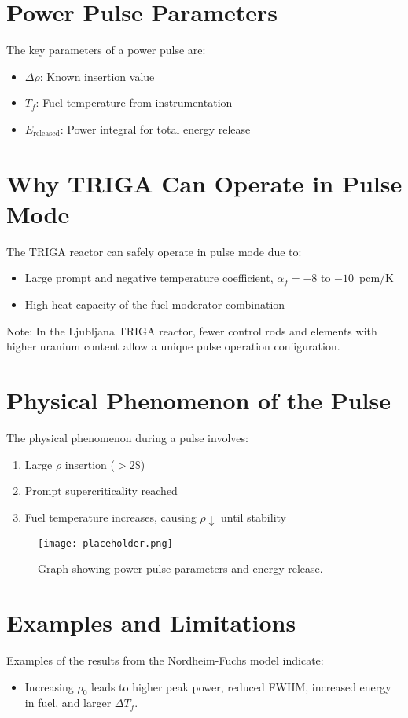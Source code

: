 \section{Power Pulse Parameters}
The key parameters of a power pulse are:
\begin{itemize}
    \item $\Delta \rho$: Known insertion value
    \item $T_f$: Fuel temperature from instrumentation
    \item $E_{\text{released}}$: Power integral for total energy release
\end{itemize}

\section{Why TRIGA Can Operate in Pulse Mode}
The TRIGA reactor can safely operate in pulse mode due to:
\begin{itemize}
    \item Large prompt and negative temperature coefficient, $\alpha_f = -8$ to $-10$~pcm/K
    \item High heat capacity of the fuel-moderator combination
\end{itemize}
Note: In the Ljubljana TRIGA reactor, fewer control rods and elements with higher uranium content allow a unique pulse operation configuration.

\section{Physical Phenomenon of the Pulse}
The physical phenomenon during a pulse involves:
\begin{enumerate}
    \item Large $\rho$ insertion ($> 2\$$)
    \item Prompt supercriticality reached
    \item Fuel temperature increases, causing $\rho \downarrow$ until stability
\end{enumerate}

\begin{figure}[h]
    \centering
    \texttt{[image: placeholder.png]}
    \caption{Graph showing power pulse parameters and energy release.}
    \label{fig:power_pulse}
\end{figure}

\section{Examples and Limitations}
Examples of the results from the Nordheim-Fuchs model indicate:
\begin{itemize}
    \item Increasing $\rho_0$ leads to higher peak power, reduced FWHM, increased energy in fuel, and larger $\Delta T_f$.
\end{itemize}

